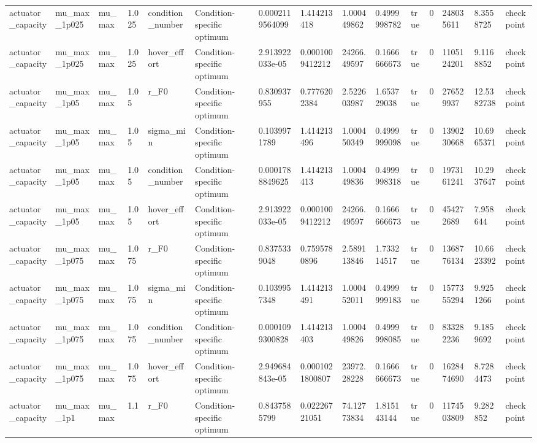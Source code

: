 \begin{tabular}{@{}lllllllllllllll@{}}
actuator\_capacity & mu\_max\_1p025 & mu\_max & 1.025 & condition\_number & Condition-specific optimum & 0.0002119564099 & 1.414213418 & 1.000449862 & 0.4999998782 & true & 0 & 248035611 & 8.3558725 & checkpoint \\
actuator\_capacity & mu\_max\_1p025 & mu\_max & 1.025 & hover\_effort & Condition-specific optimum & 2.913922033e-05 & 0.0001009412212 & 24266.49597 & 0.1666666673 & true & 0 & 1105124201 & 9.1168852 & checkpoint \\
actuator\_capacity & mu\_max\_1p05 & mu\_max & 1.05 & r\_F0 & Condition-specific optimum & 0.830937955 & 0.7776202384 & 2.522603987 & 1.653729038 & true & 0 & 276529937 & 12.5382738 & checkpoint \\
actuator\_capacity & mu\_max\_1p05 & mu\_max & 1.05 & sigma\_min & Condition-specific optimum & 0.1039971789 & 1.414213496 & 1.000450349 & 0.4999999098 & true & 0 & 1390230668 & 10.6965371 & checkpoint \\
actuator\_capacity & mu\_max\_1p05 & mu\_max & 1.05 & condition\_number & Condition-specific optimum & 0.0001788849625 & 1.414213413 & 1.000449836 & 0.4999998318 & true & 0 & 1973161241 & 10.2937647 & checkpoint \\
actuator\_capacity & mu\_max\_1p05 & mu\_max & 1.05 & hover\_effort & Condition-specific optimum & 2.913922033e-05 & 0.0001009412212 & 24266.49597 & 0.1666666673 & true & 0 & 454272689 & 7.958644 & checkpoint \\
actuator\_capacity & mu\_max\_1p075 & mu\_max & 1.075 & r\_F0 & Condition-specific optimum & 0.8375339048 & 0.7595780896 & 2.589113846 & 1.733214517 & true & 0 & 1368776134 & 10.6623392 & checkpoint \\
actuator\_capacity & mu\_max\_1p075 & mu\_max & 1.075 & sigma\_min & Condition-specific optimum & 0.1039957348 & 1.414213491 & 1.000452011 & 0.4999999183 & true & 0 & 1577355294 & 9.9251266 & checkpoint \\
actuator\_capacity & mu\_max\_1p075 & mu\_max & 1.075 & condition\_number & Condition-specific optimum & 0.0001099300828 & 1.414213403 & 1.000449826 & 0.4999998085 & true & 0 & 833282236 & 9.1859692 & checkpoint \\
actuator\_capacity & mu\_max\_1p075 & mu\_max & 1.075 & hover\_effort & Condition-specific optimum & 2.949684843e-05 & 0.0001021800807 & 23972.28228 & 0.1666666673 & true & 0 & 1628474690 & 8.7284473 & checkpoint \\
actuator\_capacity & mu\_max\_1p1 & mu\_max & 1.1 & r\_F0 & Condition-specific optimum & 0.8437585799 & 0.02226721051 & 74.12773834 & 1.815143144 & true & 0 & 1174503809 & 9.282852 & checkpoint \\

\end{tabular}
